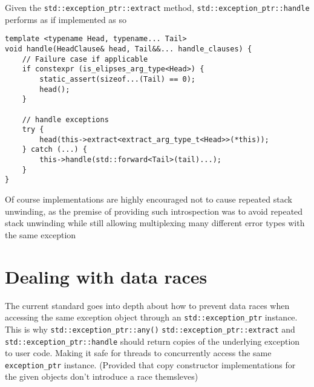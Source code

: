 \documentclass{article}
\begin{document}
Given the \texttt{std::exception\_ptr::extract} method,
\texttt{std::exception\_ptr::handle} performs as if implemented as so
\begin{lstlisting}
template <typename Head, typename... Tail>
void handle(HeadClause& head, Tail&&... handle_clauses) {
    // Failure case if applicable
    if constexpr (is_elipses_arg_type<Head>) {
        static_assert(sizeof...(Tail) == 0);
        head();
    }

    // handle exceptions
    try {
        head(this->extract<extract_arg_type_t<Head>>(*this));
    } catch (...) {
        this->handle(std::forward<Tail>(tail)...);
    }
}
\end{lstlisting}

Of course implementations are highly encouraged not to cause repeated stack
unwinding, as the premise of providing such introspection was to avoid
repeated stack unwinding while still allowing multiplexing many different
error types with the same exception

\section{Dealing with data races}
The current standard goes into depth about how to prevent data races when
accessing the same exception object through an \texttt{std::exception\_ptr}
instance.  This is why \texttt{std::exception\_ptr::any()}
\texttt{std::exception\_ptr::extract} and \texttt{std::exception\_ptr::handle}
should return copies of the underlying exception to user code.  Making it safe
for threads to concurrently access the same \texttt{exception\_ptr} instance.
(Provided that copy constructor implementations for the given objects don't
introduce a race themsleves)
\end{document}
